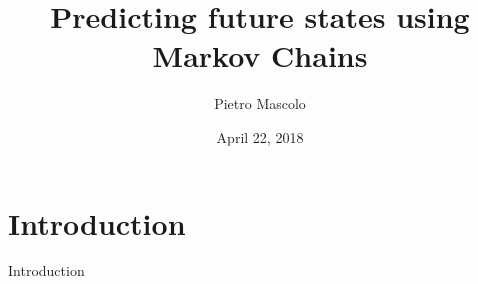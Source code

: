\documentclass[10pt]{beamer}
\author[PM]{Pietro Mascolo}
\title[Predicting the future]{Predicting future states using Markov Chains}
\institute[Optum]{Optum Ireland Ltd.}
\date{April 22, 2018}
\begin{document}
	\begin{frame}
		\titlepage
	\end{frame}


	\section{Introduction}

	\begin{frame}{Introduction}

	\end{frame}
\end{document}
